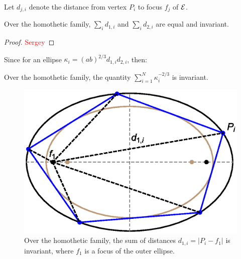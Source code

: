Let $d_{j,i}$ denote the distance from vertex $P_i$ to focus $f_j$ of $\mathcal{E}$.

\begin{proposition}
Over the homothetic family, $\sum_i{d_{1,i}}$ and $\sum_i{d_{2,i}}$ are equal and invariant.
\label{prop:dist-focus}
\end{proposition}

\begin{proof}
\textcolor{red}{Sergey}
\end{proof}

Since for an ellipse $\kappa_i=(a b)^{2/3} d_{1,i} d_{2,i}$, then:

\begin{corollary}
Over the homothetic family, the quantity $\sum_{i=1}^N{\kappa_i^{-2/3}}$ is invariant.
\label{cor:kappa}
\end{corollary}

\begin{figure}
    \centering
    \includegraphics[width=.6\textwidth]{pics/0060_spoke_sum.eps}
    \caption{Over the homothetic family, the sum of distances $d_{1,i}=|P_i-f_1|$ is invariant, where $f_1$ is a focus of the outer ellipse.}
    \label{fig:spoke-sum}
\end{figure}